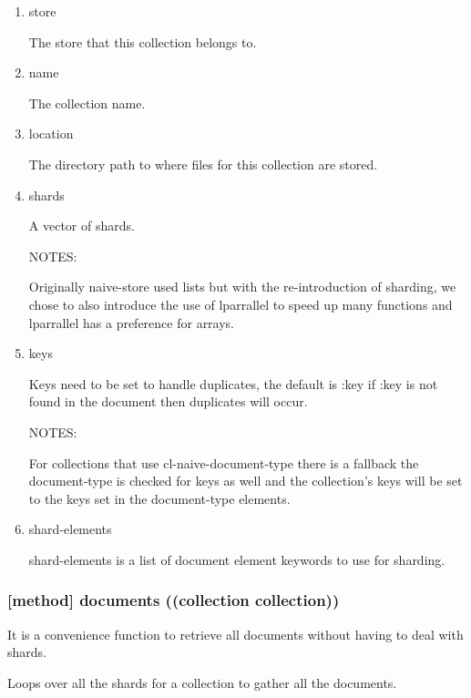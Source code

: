 \documentclass[11pt]{article}
\begin{document}
\begin{enumerate}
\item\relax [accessor] store
\label{sec:orgc7ff0a3}

The store that this collection belongs to.

\item\relax [accessor] name
\label{sec:orgc56328b}

The collection name.

\item\relax [accessor] location
\label{sec:orga7be04e}

The directory path to where files for this collection are stored.

\item\relax [accessor] shards
\label{sec:org4bdd781}

A vector of shards.

NOTES:

Originally naive-store used lists but with the re-introduction of
sharding, we chose to also introduce the use of lparrallel to speed
up many functions and lparrallel has a preference for arrays.

\item\relax [accessor] keys
\label{sec:org0890e31}

Keys need to be set to handle duplicates, the default is :key if :key
is not found in the document then duplicates will occur.

NOTES:

For collections that use cl-naive-document-type there is a fallback
the document-type is checked for keys as well and the collection's
keys will be set to the keys set in the document-type elements.

\item\relax [accessor] shard-elements
\label{sec:org5226156}

shard-elements is a list of document element keywords to use for sharding.
\end{enumerate}

\subsubsection{[method] documents ((collection collection))}
\label{sec:org9f53a2e}

It is a convenience function to retrieve all documents without having
to deal with shards.

Loops over all the shards for a collection to gather all the
documents.
\end{document}
